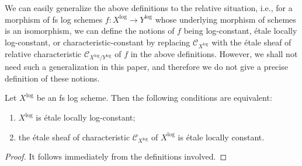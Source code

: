 \begin{rem}
  We can easily generalize the above definitions to the relative situation, i.e., for a morphism of fs log schemes $f \colon X^\log \to Y^\log$ whose underlying morphism of schemes is an isomorphism, we can define the notions of $f$ being log-constant, \'etale locally log-constant, or characteristic-constant by replacing $\mathcal{C}_{X^\log}$ with the \'{e}tale sheaf of relative characteristic $\mathcal{C}_{X^\log/Y^\log}$ of $f$ in the above definitions. However, we shall not need such a generalization in this paper, and therefore we do not give a precise definition of these notions.
\end{rem}

\begin{lem}\label{CharacterizationOfEtaleLocallyLogConstantLogSchemes}
  Let $X^\log$ be an fs log scheme. Then the following conditions are equivalent:
  \begin{enumerate}
    \item $X^\log$ is \'{e}tale locally log-constant;
    \item the \'{e}tale sheaf of characteristic $\mathcal{C}_{X^\log}$ of $X^\log$ is \'{e}tale locally constant.
  \end{enumerate}
\end{lem}
\begin{proof}
  It follows immediately from the definitions involved.
\end{proof}

